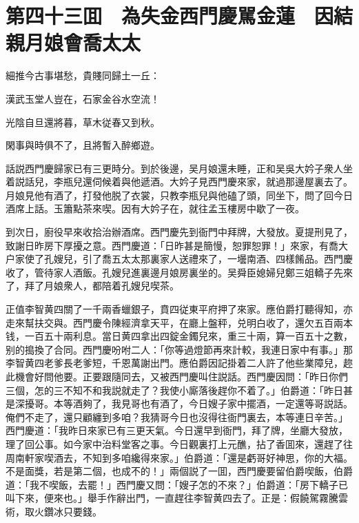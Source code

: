 
\chapter*{第四十三囬　為失金西門慶駡金蓮　因結親月娘會喬太太}

細推今古事堪愁，貴賤同歸土一丘：

漢武玉堂人豈在，石家金谷水空流！

光陰自旦還將暮，草木従春又到秋。

閑事與時俱不了，且將暫入醉鄉遊。

話説西門慶歸家已有三更時分。到於後邊，吴月娘還未睡，正和吴吳大妗子衆人坐着説話兒，李瓶兒還伺候着與他遞酒。大妗子見西門慶來家，就過那邊屋裏去了。月娘見他有酒了，打發他脱了衣裳，只教李瓶兒與他磕了頭，同坐下，問了回今日酒席上話。玉簫點茶來喫。因有大妗子在，就往孟玉樓房中歇了一夜。

到次日，廚役早來收拾治辦酒席。西門慶先到衙門中拜牌，大發放。夏提刑見了，致謝日昨房下厚擾之意。西門慶道：「日昨甚是簡慢，恕罪恕罪！」來家，有喬大户家使了孔嫂兒，引了喬五太太那裏家人送禮來了，一壜南酒、四樣餚品。西門慶收了，管待家人酒飯。孔嫂兒進裏邊月娘房裏坐的。吴舜臣媳婦兒鄭三姐轎子先來了，拜了月娘衆人，都陪着孔嫂兒喫茶。

正值李智黄四關了一千兩香蠟銀子，賁四従東平府押了來家。應伯爵打聽得知，亦走來幫扶交與。西門慶令陳經濟拿天平，在廳上盤秤，兑明白收了，還欠五百兩本钱，一百五十兩利息。當日黄四拿出四錠金鐲兒來，重三十兩，算一百五十之數，别的搗換了合同。西門慶吩咐二人：「你等過燈節再來計較，我連日家中有事。」那李智黄四老爹長老爹短，千恩萬謝出門。應伯爵因記掛着二人許了他些業障兒，趂此機會好問他要。正要跟隨同去，又被西門慶叫住説話。西門慶因問：「昨日你們三個，怎的三不知不和我説就走了？我使小廝落後趕你不着了。」伯爵道：「昨日甚是深擾哥。本等酒夠了，我見哥也有酒了，今日嫂子家中擺酒，一定還等哥説話。俺們不走了，還只顧纏到多咱？我猜哥今日也沒得往衙門裏去，本等連日辛苦。」西門慶道：「我昨日來家已有三更天氣。今日還早到衙門，拜了牌，坐廳大發放，理了回公事。如今家中治料堂客之事。今日觀裏打上元醮，拈了香囬來，還趕了往周南軒家喫酒去，不知到多咱纔得來家。」伯爵道：「還是虧哥好神思，你的大福。不是面獎，若是第二個，也成不的！」兩個説了一囬，西門慶要留伯爵喫飯，伯爵道：「我不喫飯，去罷！」西門慶又問：「嫂子怎的不來？」伯爵道：「房下轎子已叫下來，便來也。」舉手作辭出門，一直趕往李智黄四去了。正是：假饒駕霧騰雲術，取火鑽冰只要錢。

